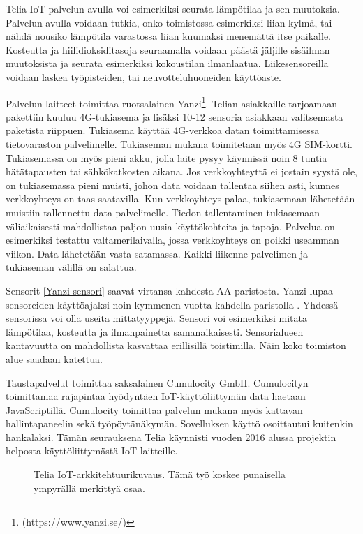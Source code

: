 \documentclass{tktltiki}
\begin{document}
Telia IoT-palvelun avulla voi esimerkiksi seurata lämpötilaa ja sen muutoksia. Palvelun avulla voidaan tutkia, onko toimistossa esimerkiksi liian kylmä, tai nähdä nousiko lämpötila varastossa liian kuumaksi menemättä itse paikalle. Kosteutta ja hiilidioksiditasoja seuraamalla voidaan päästä jäljille sisäilman muutoksista ja seurata esimerkiksi kokoustilan ilmanlaatua. Liikesensoreilla voidaan laskea työpisteiden, tai neuvotteluhuoneiden käyttöaste. 

Palvelun laitteet toimittaa ruotsalainen Yanzi\footnote[1]{(https://www.yanzi.se/)}. Telian asiakkaille tarjoamaan pakettiin kuuluu 4G-tukiasema ja lisäksi 10-12 sensoria asiakkaan valitsemasta paketista riippuen. Tukiasema käyttää 4G-verkkoa datan toimittamisessa tietovaraston palvelimelle. Tukiaseman mukana toimitetaan myös 4G SIM-kortti. Tukiasemassa on myös pieni akku, jolla laite pysyy käynnissä noin 8 tuntia hätätapausten tai sähkökatkosten aikana. Jos verkkoyhteyttä ei jostain syystä ole, on tukiasemassa pieni muisti, johon data voidaan tallentaa siihen asti, kunnes verkkoyhteys on taas saatavilla. Kun verkkoyhteys palaa, tukiasemaan lähetetään muistiin tallennettu data palvelimelle. Tiedon tallentaminen tukiasemaan väliaikaisesti mahdollistaa paljon uusia käyttökohteita ja tapoja. Palvelua on esimerkiksi testattu valtamerilaivalla, jossa verkkoyhteys on poikki useamman viikon. Data lähetetään vasta satamassa. Kaikki liikenne palvelimen ja tukiaseman välillä on salattua.

Sensorit \ref{Yanzi sensori} saavat virtansa kahdesta AA-paristosta. Yanzi lupaa sensoreiden käyttöajaksi noin kymmenen vuotta kahdella paristolla \cite{Yanzi}. Yhdessä sensorissa voi olla useita mittatyyppejä. Sensori voi esimerkiksi mitata lämpötilaa, kosteutta ja ilmanpainetta samanaikaisesti. Sensorialueen kantavuutta on mahdollista kasvattaa erillisillä toistimilla. Näin koko toimiston alue saadaan katettua. 

Taustapalvelut toimittaa saksalainen Cumulocity GmbH. Cumulocityn toimittamaa rajapintaa hyödyntäen IoT-käyttöliittymän data haetaan JavaScriptillä. Cumulocity toimittaa palvelun mukana myös kattavan hallintapaneelin sekä työpöytänäkymän. Sovelluksen käyttö osoittautui kuitenkin hankalaksi. Tämän seurauksena Telia käynnisti vuoden 2016 alussa projektin helposta käyttöliittymästä IoT-laitteille. 

\begin{figure}[h]
\begin{center}
\caption{Telia IoT-arkkitehtuurikuvaus. Tämä työ koskee punaisella ympyrällä merkittyä osaa.}
\label{Arkkitehtuurikuvaus}
\end{center}
\end{figure}
\end{document}
